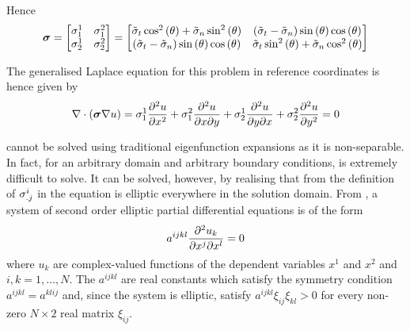 Hence
\begin{equation}
  \conductivitytensor= \begin{bmatrix}
    \conductivitytensorsymbol^{1}_{1} & \conductivitytensorsymbol^{2}_{1} \\
    \conductivitytensorsymbol^{1}_{2} & \conductivitytensorsymbol^{2}_{2} 
  \end{bmatrix} = \begin{bmatrix}
    \tilde{\conductivitytensorsymbol}_{t}\cosinesq{\theta}+\tilde{\conductivitytensorsymbol}_{n}\sinesq{\theta} & 
    \pbrac{\tilde{\conductivitytensorsymbol}_{t}-\tilde{\conductivitytensorsymbol}_{n}}\sine{\theta}\cosine{\theta} \\
    \pbrac{\tilde{\conductivitytensorsymbol}_{t}-\tilde{\conductivitytensorsymbol}_{n}}\sine{\theta}\cosine{\theta} &
    \tilde{\conductivitytensorsymbol}_{t}\sinesq{\theta}+\tilde{\conductivitytensorsymbol}_{n}\cosinesq{\theta}
  \end{bmatrix} 
  \label{eqn:AnisoPlateTransformedConductivty}
\end{equation}

The generalised Laplace equation for this problem in reference coordinates is
hence given by
\begin{equation}
  \divergence{}{\pbrac{\conductivitytensor\gradient{}u}}=
  \conductivitytensorsymbol^{1}_{1}\deltwosqby{u}{x}
  +\conductivitytensorsymbol^{2}_{1}\deltwoby{u}{x}{y}
  +\conductivitytensorsymbol^{1}_{2}\deltwoby{u}{y}{x}
  +\conductivitytensorsymbol^{2}_{2}\deltwosqby{u}{y}
  =0
  \label{eqn:AnisoPlate2DRCGenLaplace}
\end{equation}

 cannot be solved using traditional eigenfunction
expansions as it is non-separable. In fact, for an arbitrary domain and
arbitrary boundary conditions,  is extremely
difficult to solve. It can be solved, however, by realising that from the
definition of $ \sigma ^{i}_{.j}$ in  the
equation is elliptic everywhere in the solution domain. From
\citet{clements:1981}, a system of second order elliptic partial
differential equations is of the form
\begin{equation}
  a^{ijkl}\deltwoby{u_{k}}{x^{j}}{x^{l}}=0
  \label{eqn:General2ndOrderEllipticPDE}
\end{equation}
where $u_{k}$ are complex-valued functions of the dependent variables
$x^{1}$ and $x^{2}$ and $i,k=1,\ldots,N$. The $a^{ijkl}$ are real constants
which satisfy the symmetry condition $a^{ijkl}=a^{klij}$ and, since the system
is elliptic, satisfy $a^{ijkl}\xi_{ij}\xi_{kl}>0$ for every non-zero $N\times
2$ real matrix $\xi_{ij}$.

